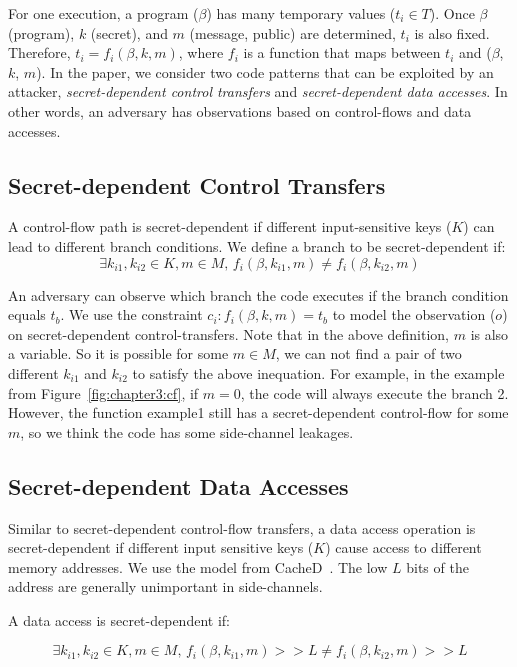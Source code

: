 For one execution, a program ($\beta$) has many temporary values ($t_i \in
  T$). Once $\beta$ (program), $k$ (secret), and $m$ (message, public) are
determined, $t_i$ is also fixed. Therefore, $ t_i = f_i(\beta, k, m)$, where $f_
  i$ is a function that maps between $t_i$ and ($\beta$, $k$, $m$). In the paper,
we consider two code patterns that can be exploited by an attacker,
\emph{secret-dependent control transfers} and \emph{secret-dependent data
  accesses}. In other words, an adversary has observations based on control-flows
and data accesses.

\subsection{Secret-dependent Control Transfers}
A control-flow path is secret-dependent if different input-sensitive keys
($K$) can lead to different branch conditions.
We define a branch to be secret-dependent if:
$$\exists k_{i1}, k_{i2} \in K, m \in M, \,f_i(\beta, k_{i1}, m) \neq f_i(\beta, k_{i2}, m)$$

An adversary can observe which branch the code executes if the branch condition
equals $t_b$. We use the constraint $c_i : f_i(\beta, k, m) = t_b$ to model
the observation ($o$) on secret-dependent control-transfers. Note that in the
above definition, $m$ is also a variable. So it is possible for some $m \in M$,
we can not find a pair of two different $k_{i1}$ and $k_{i2}$ to satisfy the above
inequation. For example, in the example from Figure~\ref{fig:chapter3:cf}, if $m = 0$,
the code will always execute the branch 2. However, the function \textsf{example1} still
has a secret-dependent control-flow for some $m$, so we think the code has
some side-channel leakages.


\subsection{Secret-dependent Data Accesses}
Similar to secret-dependent control-flow transfers, a data access operation is
secret-dependent if different input sensitive keys ($K$) cause access to different
memory addresses. We use the model from CacheD~\cite{203878}. The low $L$ bits
of the address are generally unimportant in side-channels.

A data access is secret-dependent if:

$$\exists k_{i1}, k_{i2} \in K, m \in M,\,f_i(\beta, k_{i1}, m) >> L \neq f_i(\beta, k_{i2}, m) >> L$$

